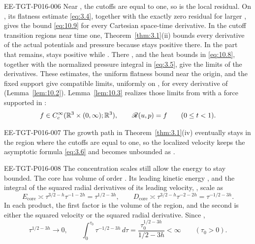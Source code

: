 \begin{EESegment}{EE-TGT-P016-006}
Near , the cutoffs are equal to one, so
 is the local residual. On
, its flatness estimate \eqref{eq:3.4}, together
with the exactly zero residual for larger , gives the bound
\eqref{eq:10.9} for every Cartesian space-time
derivative. In the cutoff transition regions near time one,
Theorem~\ref{thm:3.1}\textup{(ii)} bounds every derivative of the actual potentials and
pressure because  stays positive there. In the part that remains,
 stays positive while . There
, and the heat bounds in \eqref{eq:10.8}, together with the
normalized pressure integral in \eqref{eq:3.5}, give the limits of the derivatives. These
estimates, the uniform flatness bound near the origin, and the fixed support
 give compatible limits, uniformly on
, for every derivative of 
(Lemma~\ref{lem:10.2}). Lemma~\ref{lem:10.3} realizes those limits from
 with a force supported in
:
\[
f\in C_c^\infty(\mathbb{R}^3\times(0,\infty);\mathbb{R}^3),
\qquad
\mathscr R(u,p)=f
\qquad(0\leq t<1).
\]
\end{EESegment}

\begin{EESegment}{EE-TGT-P016-007}
The growth path in Theorem~\ref{thm:3.1}\textup{(iv)} eventually stays in the region where
the cutoffs are equal to one, so the localized velocity keeps the asymptotic formula
\eqref{eq:3.6} and becomes unbounded as .
\end{EESegment}

\begin{EESegment}{EE-TGT-P016-008}
The concentration scales still allow the energy to stay bounded. The core
 has volume of order
. Its leading kinetic energy
, and the integral of the squared radial derivatives
of its leading velocity, , scale as
\[
E_{\mathrm{core}}\asymp\tau^{3/2-h}\tau^{-1-2h}=\tau^{1/2-3h},
\qquad
D_{\mathrm{core}}\asymp\tau^{3/2-h}\tau^{-2-2h}=\tau^{-1/2-3h}.
\]
In each product, the first factor is the volume of the region, and the second is either the
squared velocity or the squared radial derivative. Since ,
\[
\tau^{1/2-3h}\longrightarrow0,
\qquad
\int_0^{\tau_0}\tau^{-1/2-3h}\,d\tau
=\frac{\tau_0^{1/2-3h}}{1/2-3h}<\infty
\qquad(\tau_0>0).
\]
\end{EESegment}

